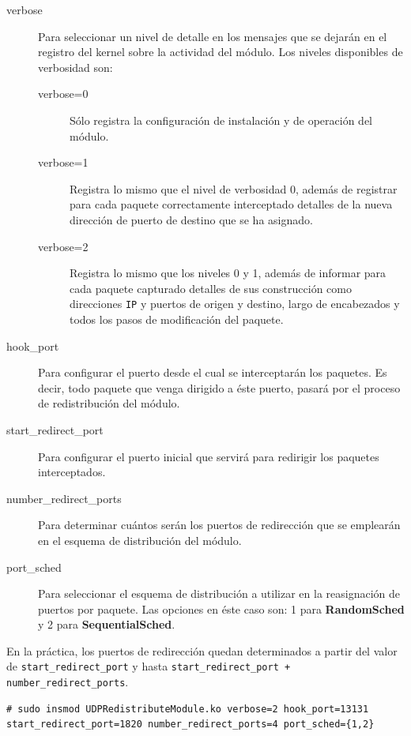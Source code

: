 \begin{description}
\item[verbose] Para seleccionar un nivel de detalle en los mensajes que se dejarán en el registro del kernel sobre la actividad del módulo. Los niveles disponibles de verbosidad son:
\begin{description}
\item[verbose=0] Sólo registra la configuración de instalación y de operación del módulo.
\item[verbose=1] Registra lo mismo que el nivel de verbosidad 0, además de registrar para cada paquete correctamente interceptado detalles de la nueva dirección de puerto de destino que se ha asignado.
\item[verbose=2] Registra lo mismo que los niveles 0 y 1, además de informar para cada paquete capturado detalles de sus construcción como direcciones \verb=IP= y puertos de origen y destino, largo de encabezados y todos los pasos de modificación del paquete.
\end{description}
\item[hook\_port] Para configurar el puerto desde el cual se interceptarán los paquetes. Es decir, todo paquete que venga dirigido a éste puerto, pasará por el proceso de redistribución del módulo.
\item[start\_redirect\_port] Para configurar el puerto inicial que servirá para redirigir los paquetes interceptados.
\item[number\_redirect\_ports] Para determinar cuántos serán los puertos de redirección que se emplearán en el esquema de distribución del módulo.
\item[port\_sched] Para seleccionar el esquema de distribución a utilizar en la reasignación de puertos por paquete. Las opciones en éste caso son: 1 para \textbf{RandomSched} y 2 para \textbf{SequentialSched}.
\end{description}

En la práctica, los puertos de redirección quedan determinados a partir del valor de \verb=start_redirect_port= y hasta \verb=start_redirect_port + number_redirect_ports=.

\vspace{1pc}
\begin{lstlisting}[style=BashInputStyle,	breaklines=true, caption=Ejemplo de instalación de la solución, captionpos=b]
    # sudo insmod UDPRedistributeModule.ko verbose=2 hook_port=13131 start_redirect_port=1820 number_redirect_ports=4 port_sched={1,2}
\end{lstlisting}


